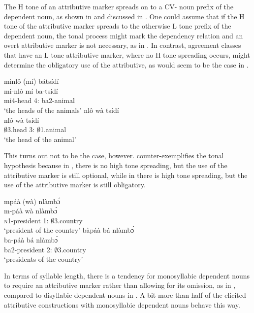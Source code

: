 The H tone of an attributive marker spreads on to a CV- noun prefix of the dependent noun, as shown in  and discussed in . One could assume that if the H tone of the attributive marker spreads to the otherwise L tone prefix of the dependent noun, the tonal process might mark the dependency relation and an overt attributive marker is not necessary, as in . In contrast, agreement classes that have an L tone attributive marker, where no H tone spreading occurs, might determine the obligatory use of the attributive, as would seem to be the case in .

\ea\label{TON}
\ea\label{TON2}
 \glll mìnlô (mí) bátsídí \\
 mi-nlô mí ba-tsídí \\
               mi4-head 4:{\ATT} ba2-animal \\
    \trans `the heads of the animals'
\ex \label{TON1}
  \glll   nlô wà tsídí \\
         nlô wà tsídí \\
               $\emptyset$3.head 3:{\ATT} $\emptyset$1.animal  \\
    \trans `the head of the animal'
\z
\z

This turns out not to be the case, however.  counter-exemplifies the tonal hypothesis because in , there is no high tone spreading, but the use of the attributive marker is still optional, while in  there is high tone spreading, but the use of the attributive marker is still obligatory.

\ea\label{pres}
\ea \label{pres1}
  \glll     mpáà (wà) nlàmbɔ́ \\
        m-páà wà nlàmbɔ́ \\
               \textsc{n}1-president 1:{\ATT} $\emptyset$3.country  \\
    \trans `president of the country'
\ex\label{pres2}
 \glll    bàpáà bá nlàmbɔ́ \\
 ba-páà bá nlàmbɔ́ \\
    ba2-president 2:{\ATT} $\emptyset$3.country \\
    \trans `presidents of the country'
\z
\z

In terms of syllable length, there is a tendency for  monosyllabic dependent nouns to require an attributive marker rather than allowing for its omission, as in , compared to disyllabic dependent nouns in . A bit more than half of the elicited attributive constructions with monosyllabic dependent nouns behave this way.%


